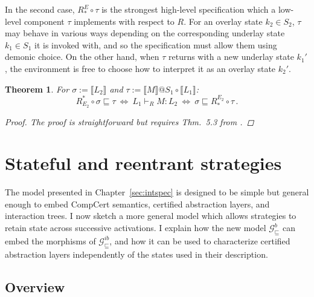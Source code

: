 \documentclass[11pt,oneside,draft]{book}
\newtheorem{theorem}{Theorem}[chapter]
\newtheorem{lemma}[theorem]{Lemma}
\theoremstyle{definition}
\newcommand{\gcat}{\mathcal{G}_{\sqsubseteq}}
\begin{document}
In the second case,
$R_*^E \circ \tau$ is %
the strongest high-level specification
which a low-level component $\tau$ implements
with respect to $R$.
For an overlay state $k_2 \in S_2$,
$\tau$ may behave in various ways
depending on the corresponding underlay state $k_1 \in S_1$
it is invoked with,
and so the specification must allow them using demonic choice.
On the other hand,
when $\tau$ returns with a new underlay state $k_1'$,
the environment is free to choose
how to interpret it as an overlay state $k_2'$.


\begin{theorem}
For
$\sigma := \llbracket L_2 \rrbracket$ and
$\tau := \llbracket M \rrbracket @ S_1 \circ \llbracket L_1 \rrbracket$:
\[
  R^*_{E_2} \!\circ \sigma \sqsubseteq \tau
  \: \Leftrightarrow \:
  L_1 \vdash_R M : L_2
  \: \Leftrightarrow \:
  \sigma \sqsubseteq R_*^{E_2} \!\circ \tau \,.
\]
\begin{proof}
The proof is straightforward but requires
Thm.~5.3 from \citet{dndf}.
\end{proof}
\end{theorem}




\chapter{Stateful and reentrant strategies} \label{sec:gamesem} %

The model presented in Chapter~\ref{sec:intspec}
is designed to be simple but
general enough to embed CompCert semantics, certified
abstraction layers, and interaction trees.
I now sketch a more general model
which allows strategies to retain state
across successive activations.
I explain how the new model $\gcat^b$ can embed
the morphisms of $\gcat^{ib}$,
and how it can be used to characterize
certified abstraction layers
independently of the states used in their description.

\section{Overview} %
\label{sec:arrow}
\end{document}

